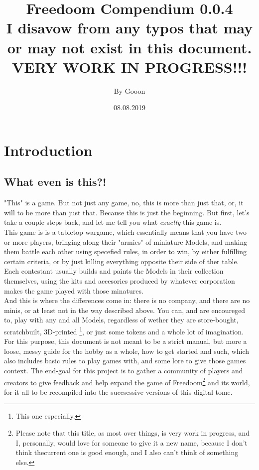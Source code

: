 \documentclass[a4paper,12pt]{book}
\begin{document}
\title{\Large{\textbf{Freedoom Compendium 0.0.4\\ I disavow from any typos that may or may not exist in this document.\\ VERY WORK IN PROGRESS!!!}}}
\author{By Gooon}
\date{08.08.2019}

\maketitle
\let\cleardoublepage\clearpage
\tableofcontents
\pagebreak

\chapter{Introduction}
\section{What even is this?!}
"This" is a game. But not just any game, no, this is more than just that, or,  it will to be more than just that. Because this is just the beginning. But first, let's take a couple steps back, and let me tell you what \textit{exactly} this game is. \\
This game is is a tabletop-wargame, which essentially means that you have two or more players, bringing along their "armies" of miniature Models, and making them battle each other using specefied rules, in order to win, by either fulfilling certain criteria, or by just killing everything opposite their side of ther table. Each contestant usually builds and paints the Models in their collection themselves, using the kits and accesories produced by whatever corporation makes the game played with those minatures. \\
And this is where the differences come in: there is no company, and there are no minis, or at least not in the way described above. You can, and are encoureged to, play with any and all Models, regardless of wether they are store-bought, scratchbuilt, 3D-printed \footnote{This one especially.}, or just some tokens and a whole lot of imagination. For this purpose, this document is not meant to be a strict manual, but more a loose, messy guide for the hobby as a whole, how to get started and such, which also includes basic rules to play games with, and some lore to give those games context. The end-goal for this project is to gather a community of players and creators to give feedback and help expand the game of Freedoom\footnote{Please note that this title, as most over things, is very work in progress, and I, personally, would love for someone to give it a new name, because I don't think thecurrent one is good enough, and I also can't think of something else.} and its world, for it all to be recompiled into the succsessive versions of this digital tome.
\end{document}
